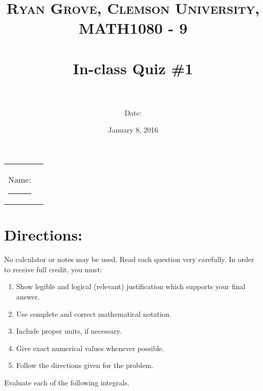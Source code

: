 \documentclass[paper=a4, fontsize=11pt]{scrartcl} %
\title{	
\normalfont \normalsize 
\textsc{Ryan Grove, Clemson University, MATH1080 - 9} \\ [25pt] %
\horrule{0.5pt} \\[0.4cm] %
\huge In-class Quiz \#1 \\ %
\horrule{2pt} \\[0.5cm] %
}
\author{Date:} %
\date{\normalsize January 8, 2016} %
\numberwithin{equation}{section} %
\numberwithin{figure}{section} %
\numberwithin{table}{section} %
\begin{document}
\maketitle %

\begin{flushleft}
\begin{tabular}{l l}
Name: \rule{3.2in}{.01cm}  & {}%
\end{tabular}
\end{flushleft}


\section*{\textbf{Directions:}}

No calculator or notes may be used.  Read each question very carefully.  In order to receive full credit, you must:
\begin{enumerate}
\item Show legible and logical (relevant) justification which supports your final answer.
\item Use complete and correct mathematical notation.
\item Include proper units, if necessary.
\item Give exact numerical values whenever possible.
\item Follow the directions given for the problem.
\end{enumerate}
\vspace{.1in}

Evaluate each of the following integrals.

\newpage
\end{document}
